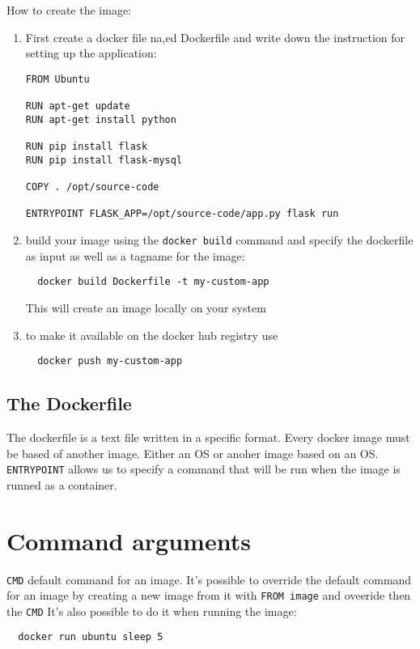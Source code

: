 \documentclass[french]{article}
\begin{document}
How to create the image:
\begin{enumerate}
  \item First create a docker file na,ed Dockerfile and write down the instruction for setting up the application:
\begin{verbatim}
FROM Ubuntu

RUN apt-get update
RUN apt-get install python

RUN pip install flask
RUN pip install flask-mysql

COPY . /opt/source-code

ENTRYPOINT FLASK_APP=/opt/source-code/app.py flask run
\end{verbatim}
\item build your image using the \verb|docker build| command and specify the dockerfile as input as well as a tagname for the image:
\begin{verbatim}
  docker build Dockerfile -t my-custom-app
\end{verbatim}
This will create an image locally on your system
\item to make it available on the docker hub registry use
\begin{verbatim}
  docker push my-custom-app
\end{verbatim}
\end{enumerate}

\subsection{The Dockerfile}

The dockerfile is a text file written in a specific format. Every docker image must be based of another image. Either an OS or anoher image based on an OS. \\
\verb|ENTRYPOINT| allows us to specify a command that will be run when the image is runned as a container.

\section{Command arguments}

\verb|CMD| default command for an image. It's possible to override the default command for an image by creating a new image from it with \verb|FROM image| and oveeride then the \verb|CMD|
It's also possible to do it when running the image:
\begin{verbatim}
  docker run ubuntu sleep 5
\end{verbatim}
\end{document}
